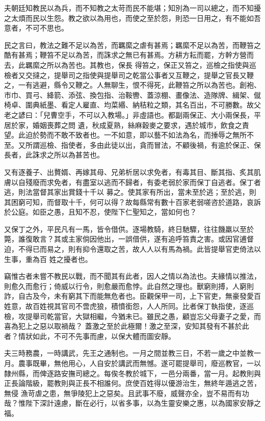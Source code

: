 \begin{pinyinscope}
 夫朝廷知教民以為兵，而不知教之太苛而民不能堪；知別為一司以總之，而不知擾之太煩而民以生怨。教之欲以為用也，而使之至於怨，則恐一日用之，有不能如吾意者，不可不思也。



 民之言曰，教法之難不足以為苦，而羈縻之虐有甚焉；羈縻不足以為苦，而鞭笞之酷有甚焉；鞭笞不足以為苦，而誅求之無已有甚焉。方耕方耘而罷，方幹方營而去，此羈縻之所以為苦也。其教也，保長
 得笞之，保正又笞之，巡檢之指使與巡檢者又交撻之，提舉司之指使與提舉司之乾當公事者又互鞭之，提舉之官長又鞭之，一有逃避，縣令又鞭之。人無聊生，恨不得死，此鞭笞之所以為苦也。創袍、市巾、買弓、絳箭、添弦、換包指、治鞍轡、蓋涼棚、畫像法、造隊牌、緝架、僦椅卓、圍典紙墨、看定人雇直、均菜緡、納秸粒之類，其名百出，不可勝數。故父老之諺曰：「兒曹空手，不可以入教場。」非虛語也。都副兩保正、大小兩保長，平居於家，婚姻喪葬之問
 遺，秋成夏熟，絲麻穀麥之要求，遇於城市，飲食之責望。此迫於勢而不敢不致者也。一不如意，即以藝不如法為名，而捶辱之無所不至。又所謂巡檢、指使者，多由此徒以出，貪而冒法，不顧後禍，有逾於保正、保長者，此誅求之所以為甚苦也。



 又有逐養子、出贅婿、再嫁其母、兄弟析居以求免者，有毒其目、斷其指、炙其肌膚以自殘廢而求免者，有盡室以逃而不歸者，有委老弱於家而保丁自逃者。保丁者逃，則法當督其家出賞錢十千以
 募之。使其家有所出，當未至於逃；至於逃，則其困窮可知，而督取十千，何可以得？故每縣常有數十百家老弱嗟咨於道路，哀訴於公庭。如臣之愚，且知不忍，使陛下仁聖知之，當如何也？



 又保丁之外，平民凡有一馬，皆令借供。逐場教騎，終日馳驟，往往饑羸以至於斃，誰復敢言？其或主家倘因他出，一誤借供，遂有追呼笞責之害。或因官逋督迫，不得已而易之，則有抑令還取之苦，故人人以有馬為禍。此皆提舉官吏倚法以生事，重為百
 姓之擾者也。



 竊惟古者未嘗不教民以戰，而不聞其有此者，因人之情以為法也。夫緣情以推法，則愈久而愈行；倚威以行令，則愈嚴而愈悖。此自然之理也。獸窮則搏，人窮則詐，自古及今，未有窮其下而能無危者也。臣觀保甲一司，上下官吏，無豪發愛百姓意，故百姓視其官司不啻虎狼，積憤銜怨，人人所同。比者保丁執指使，逐巡檢，攻提舉司乾當官，大獄相繼，今猶未已。雖民之愚，顧豈忘父母妻子之愛，而喜為犯上之惡以取禍哉？
 蓋激之至於此極爾！激之至深，安知其發有不甚於此者？情狀如此，不可不先事而慮，以保大體而圖安靜。



 夫三時務農，一時講武，先王之通制也。一月之間並教三日，不若一歲之中並教一月。農事既畢，無他用心，人自安於講武而無憾。遂可罷提舉司，廢巡教官，一以隸州縣，而俾逐路安撫司總之。每俟冬教於城下，一邑分兩番，當一月。起教則與正長論階級，罷教則與正長不相誰何。庶使百姓得以優游治生，無終年遁逃之苦，無侵
 漁苛虐之患，無爭陵犯上之惡矣。且武事不廢，威聲亦全，豈不易而有功哉？惟陛下深計遠慮，斷在必行，以省多事，以為生靈安樂之惠，以為國家安靜之福。




\end{pinyinscope}
